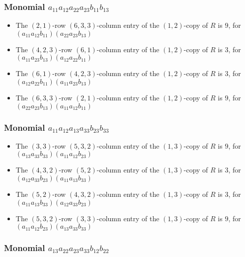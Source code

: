 \documentclass{article}
\begin{document}
\subsubsection{Monomial $ a_{11} a_{12} a_{22} a_{23} b_{11} b_{13} $}

\begin{itemize}
\item The $(2, 1)$-row $(6, 3, 3)$-column entry of the $ \left(1, 2\right) $-copy of $R$ is $ 9 $, for $( a_{11} a_{12} b_{11} )( a_{22} a_{23} b_{13} )$ 
\item The $(4, 2, 3)$-row $(6, 1)$-column entry of the $ \left(1, 2\right) $-copy of $R$ is $ 3 $, for $( a_{11} a_{23} b_{13} )( a_{12} a_{22} b_{11} )$ 
\item The $(6, 1)$-row $(4, 2, 3)$-column entry of the $ \left(1, 2\right) $-copy of $R$ is $ 3 $, for $( a_{12} a_{22} b_{11} )( a_{11} a_{23} b_{13} )$ 
\item The $(6, 3, 3)$-row $(2, 1)$-column entry of the $ \left(1, 2\right) $-copy of $R$ is $ 9 $, for $( a_{22} a_{23} b_{13} )( a_{11} a_{12} b_{11} )$ 
\end{itemize}
\subsubsection{Monomial $ a_{11} a_{12} a_{13} a_{33} b_{23} b_{33} $}

\begin{itemize}
\item The $(3, 3)$-row $(5, 3, 2)$-column entry of the $ \left(1, 3\right) $-copy of $R$ is $ 9 $, for $( a_{13} a_{33} b_{33} )( a_{11} a_{12} b_{23} )$ 
\item The $(4, 3, 2)$-row $(5, 2)$-column entry of the $ \left(1, 3\right) $-copy of $R$ is $ 3 $, for $( a_{12} a_{33} b_{23} )( a_{11} a_{13} b_{33} )$ 
\item The $(5, 2)$-row $(4, 3, 2)$-column entry of the $ \left(1, 3\right) $-copy of $R$ is $ 3 $, for $( a_{11} a_{13} b_{33} )( a_{12} a_{33} b_{23} )$ 
\item The $(5, 3, 2)$-row $(3, 3)$-column entry of the $ \left(1, 3\right) $-copy of $R$ is $ 9 $, for $( a_{11} a_{12} b_{23} )( a_{13} a_{33} b_{33} )$ 
\end{itemize}
\subsubsection{Monomial $ a_{13} a_{22} a_{23} a_{33} b_{12} b_{22} $}
\end{document}
